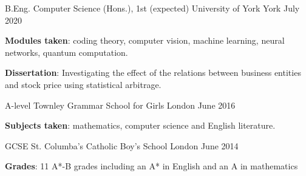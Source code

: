
\begin{cventries}
  \cventry
    {B.Eng. Computer Science (Hons.), 1st (expected)} %
    {University of York} %
    {York} %
    {July 2020} %
    {
      \begin{cvitems} %
         \item {\textbf{Modules taken}: coding theory, computer vision, machine learning, neural networks, quantum computation.}
         \vspace{0.5mm}
         \item {\textbf{Dissertation}: Investigating the effect of the relations between business entities and stock price using statistical arbitrage.}
      \end{cvitems}
    }

  \cventry
    {A-level} %
    {Townley Grammar School for Girls} %
    {London} %
    {June 2016} %
    {
      \begin{cvitems} %
      \item {\textbf{Subjects taken}: mathematics, computer science and English literature.}
      \end{cvitems}
    }

  \cventry
    {GCSE} %
    {St. Columba’s Catholic Boy’s School} %
    {London} %
    {June 2014} %
    {
      \begin{cvitems} %
      \item {\textbf{Grades}: 11 A*-B grades including an A* in English and an A in mathematics}
      \end{cvitems}
    }
\end{cventries}
